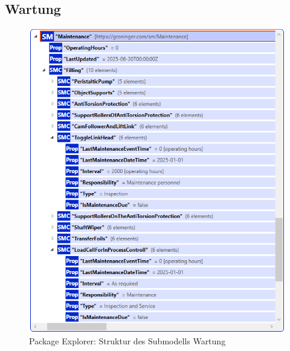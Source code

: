 \subsection{Wartung}
\begin{figure}[H]
    \centering
        \includegraphics[width=1\textwidth]{Bilder/ErgebnissePackageExplorer/Wartung.PNG}
    \caption{Package Explorer: Struktur des Submodells Wartung}
    \label{fig:SMWartung}
\end{figure}

